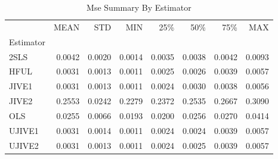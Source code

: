 \begin{table}[ht]
\centering
\caption{Mse Summary By Estimator}
\begin{tabular}{lrrrrrrr}
\toprule
 & MEAN & STD & MIN & 25\% & 50\% & 75\% & MAX \\
Estimator &  &  &  &  &  &  &  \\
\midrule
2SLS & 0.0042 & 0.0020 & 0.0014 & 0.0035 & 0.0038 & 0.0042 & 0.0093 \\
HFUL & 0.0031 & 0.0013 & 0.0011 & 0.0025 & 0.0026 & 0.0039 & 0.0057 \\
JIVE1 & 0.0031 & 0.0013 & 0.0011 & 0.0024 & 0.0030 & 0.0038 & 0.0056 \\
JIVE2 & 0.2553 & 0.0242 & 0.2279 & 0.2372 & 0.2535 & 0.2667 & 0.3090 \\
OLS & 0.0255 & 0.0066 & 0.0193 & 0.0200 & 0.0256 & 0.0270 & 0.0414 \\
UJIVE1 & 0.0031 & 0.0014 & 0.0011 & 0.0024 & 0.0024 & 0.0039 & 0.0057 \\
UJIVE2 & 0.0031 & 0.0013 & 0.0011 & 0.0024 & 0.0025 & 0.0039 & 0.0057 \\
\bottomrule
\end{tabular}
\end{table}
